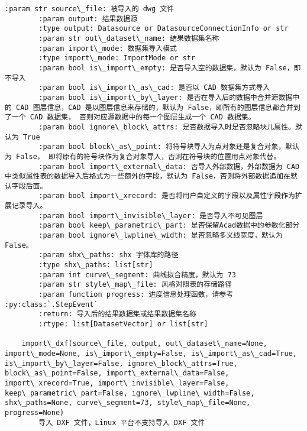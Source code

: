 \documentclass[11pt]{article}
\begin{document}
\begin{Verbatim}[commandchars=\\\{\}]
        :param str source\_file: 被导入的 dwg 文件
        :param output: 结果数据源
        :type output: Datasource or DatasourceConnectionInfo or str
        :param str out\_dataset\_name: 结果数据集名称
        :param import\_mode: 数据集导入模式
        :type import\_mode: ImportMode or str
        :param bool is\_import\_empty: 是否导入空的数据集，默认为 False，即不导入
        :param bool is\_import\_as\_cad: 是否以 CAD 数据集方式导入
        :param bool is\_import\_by\_layer: 是否在导入后的数据中合并源数据中的 CAD 图层信息，CAD 是以图层信息来存储的，默认为 False，即所有的图层信息都合并到了一个 CAD 数据集， 否则对应源数据中的每一个图层生成一个 CAD 数据集。
        :param bool ignore\_block\_attrs: 是否数据导入时是否忽略块儿属性。默认为 True
        :param bool block\_as\_point: 将符号块导入为点对象还是复合对象，默认为 False， 即将原有的符号块作为复合对象导入，否则在符号块的位置用点对象代替。
        :param bool import\_external\_data: 否导入外部数据，外部数据为 CAD 中类似属性表的数据导入后格式为一些额外的字段，默认为 False，否则将外部数据追加在默认字段后面。
        :param bool import\_xrecord: 是否将用户自定义的字段以及属性字段作为扩展记录导入。
        :param bool import\_invisible\_layer: 是否导入不可见图层
        :param bool keep\_parametric\_part: 是否保留Acad数据中的参数化部分
        :param bool ignore\_lwpline\_width: 是否忽略多义线宽度，默认为 False。
        :param shx\_paths: shx 字体库的路径
        :type shx\_paths: list[str]
        :param int curve\_segment: 曲线拟合精度，默认为 73
        :param str style\_map\_file: 风格对照表的存储路径
        :param function progress: 进度信息处理函数，请参考 :py:class:`.StepEvent`
        :return: 导入后的结果数据集或结果数据集名称
        :rtype: list[DatasetVector] or list[str]
    
    import\_dxf(source\_file, output, out\_dataset\_name=None, import\_mode=None, is\_import\_empty=False, is\_import\_as\_cad=True, is\_import\_by\_layer=False, ignore\_block\_attrs=True, block\_as\_point=False, import\_external\_data=False, import\_xrecord=True, import\_invisible\_layer=False, keep\_parametric\_part=False, ignore\_lwpline\_width=False, shx\_paths=None, curve\_segment=73, style\_map\_file=None, progress=None)
        导入 DXF 文件，Linux 平台不支持导入 DXF 文件
        

\end{Verbatim}
\end{document}
